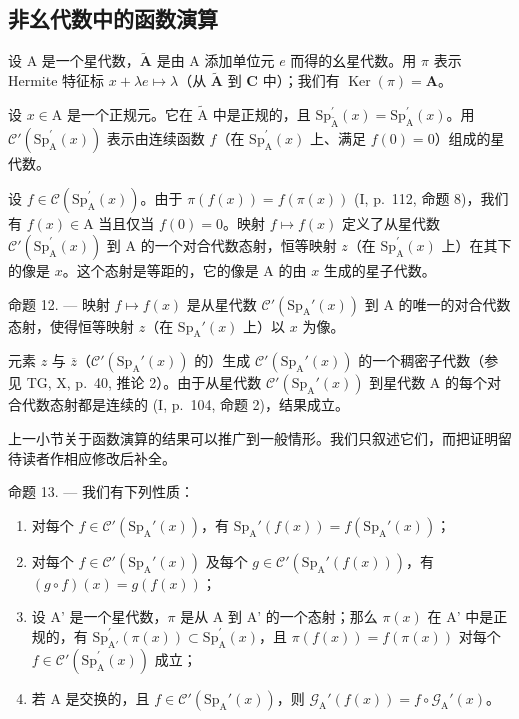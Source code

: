 \subsection{非幺代数中的函数演算}

设 A 是一个星代数，\(\widetilde{\mathbf{A}}\) 是由 A 添加单位元 \(e\) 而得的幺星代数。用 \(\pi\) 表示 Hermite 特征标 \(x + \lambda e \mapsto \lambda\)（从 \(\widetilde{\mathbf{A}}\) 到 \(\mathbf{C}\) 中）；我们有 \(\operatorname{Ker}(\pi) = \mathbf{A}\)。

设 \(x \in \mathrm{A}\) 是一个正规元。它在 \(\widetilde{\mathrm{A}}\) 中是正规的，且 \(\mathrm{Sp}_{\widetilde{\mathrm{A}}}^{\prime}(x) = \mathrm{Sp}_{\mathrm{A}}^{\prime}(x)\)。用 \(\mathcal{C}'(\mathrm{Sp}_{\mathrm{A}}^{\prime}(x))\) 表示由连续函数 \(f\)（在 \(\mathrm{Sp}_{\mathrm{A}}^{\prime}(x)\) 上、满足 \(f(0) = 0\)）组成的星代数。

设 \(f \in \mathcal{C}(\mathrm{Sp}_{\mathrm{A}}^{\prime}(x))\)。由于 \(\pi(f(x)) = f(\pi(x))\) (I, p.~112, 命题 8)，我们有 \(f(x) \in \mathrm{A}\) 当且仅当 \(f(0) = 0\)。映射 \(f \mapsto f(x)\) 定义了从星代数 \(\mathcal{C}'(\mathrm{Sp}_{\mathrm{A}}^{\prime}(x))\) 到 A 的一个对合代数态射，恒等映射 \(z\)（在 \(\mathrm{Sp}_{\mathrm{A}}^{\prime}(x)\) 上）在其下的像是 \(x\)。这个态射是等距的，它的像是 A 的由 \(x\) 生成的星子代数。

命题 12. --- 映射 \(f \mapsto f(x)\) 是从星代数 \(\mathcal{C}'(\mathrm{Sp}_{\mathrm{A}}'(x))\) 到 A 的唯一的对合代数态射，使得恒等映射 \(z\)（在 \(\mathrm{Sp}_{\mathrm{A}}'(x)\) 上）以 \(x\) 为像。

元素 \(z\) 与 \(\overline{z}\)（\(\mathcal{C}'(\mathrm{Sp}_{\mathrm{A}}'(x))\) 的）生成 \(\mathcal{C}'(\mathrm{Sp}_{\mathrm{A}}'(x))\) 的一个稠密子代数（参见 TG, X, p.~40, 推论 2）。由于从星代数 \(\mathcal{C}'(\mathrm{Sp}_{\mathrm{A}}'(x))\) 到星代数 A 的每个对合代数态射都是连续的 (I, p.~104, 命题 2)，结果成立。

上一小节关于函数演算的结果可以推广到一般情形。我们只叙述它们，而把证明留待读者作相应修改后补全。

命题 13. --- 我们有下列性质：

\begin{enumerate}
\def\labelenumi{\alph{enumi})}
\item
  对每个 \(f \in \mathcal{C}'(\mathrm{Sp}_{\mathrm{A}}'(x))\)，有 \(\mathrm{Sp}_{\mathrm{A}}'(f(x)) = f(\mathrm{Sp}_{\mathrm{A}}'(x))\)；
\item
  对每个 \(f \in \mathcal{C}'(\mathrm{Sp}_{\mathrm{A}}'(x))\) 及每个 \(g \in \mathcal{C}'(\mathrm{Sp}_{\mathrm{A}}'(f(x)))\)，有 \((g \circ f)(x) = g(f(x))\)；
\item
  设 A' 是一个星代数，\(\pi\) 是从 A 到 A' 的一个态射；那么 \(\pi(x)\) 在 A' 中是正规的，有 \(\mathrm{Sp}_{\mathrm{A}'}^{\prime}(\pi(x)) \subset \mathrm{Sp}_{\mathrm{A}}^{\prime}(x)\)，且 \(\pi(f(x)) = f(\pi(x))\) 对每个 \(f \in \mathcal{C}'(\mathrm{Sp}_{\mathrm{A}}^{\prime}(x))\) 成立；
\item
  若 A 是交换的，且 \(f \in \mathcal{C}'(\mathrm{Sp}_{\mathrm{A}}'(x))\)，则 \(\mathcal{G}_{\mathrm{A}}'(f(x)) = f \circ \mathcal{G}_{\mathrm{A}}'(x)\)。
\end{enumerate}

